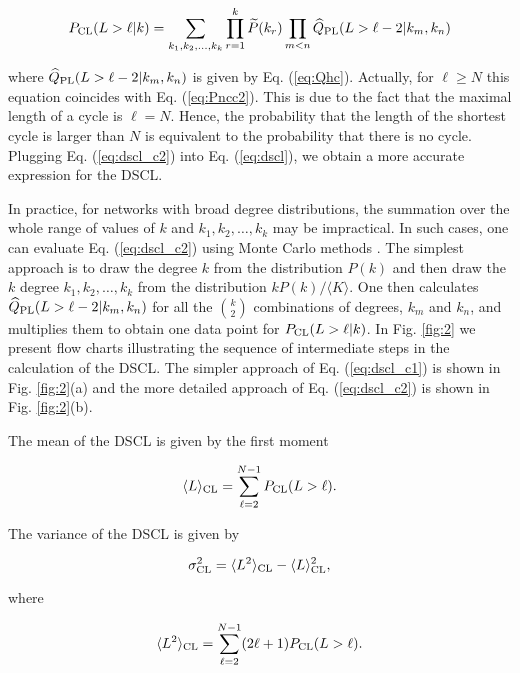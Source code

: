 \documentclass[preprint,pre,superscriptaddress,showpacs]{revtex4}
\begin{document}
\begin{equation}
P_{\rm CL}(L>\ell | k) = 
\sum_{k_1,k_2,\dots,k_k}
\prod_{r=1}^k
\widetilde P(k_r)
\prod_{m < n} 
\widehat Q_{\rm PL}(L>\ell-2 | k_m,k_n)
\label{eq:dscl_c2}
\end{equation}

\noindent
where 
$\widehat Q_{\rm PL}(L>\ell-2 | k_m,k_n)$
is given by Eq. (\ref{eq:Qhc}).
Actually, for $\ell \ge N$ this equation coincides with 
Eq. (\ref{eq:Pncc2}).
This is due to the fact that the maximal length of a cycle is $\ell=N$.
Hence, the probability that the length of the shortest cycle is larger than $N$ is equivalent to
the probability that there is no cycle.
Plugging Eq. (\ref{eq:dscl_c2}) into Eq. (\ref{eq:dscl}),
we obtain a more accurate expression for the DSCL.

In practice, for networks with broad degree distributions,
the summation over the whole range of values of $k$ and
$k_1,k_2,\dots,k_k$ may be impractical. In such cases,
one can evaluate Eq. (\ref{eq:dscl_c2}) using 
Monte Carlo methods
\cite{Newman1999}. 
The simplest approach is to draw the degree $k$ from the
distribution $P(k)$ and then draw the $k$ degree $k_1,k_2,\dots,k_k$
from the distribution $k P(k)/\langle K \rangle$.
One then calculates
$\widehat Q_{\rm PL}(L>\ell-2 | k_m,k_n)$
for all the $\binom{k}{2}$ combinations of degrees, $k_m$ and $k_n$,
and multiplies them to obtain one data point for
$P_{\rm CL}(L>\ell | k)$.
In Fig. \ref{fig:2} we present flow 
charts illustrating the sequence of intermediate steps in the
calculation of the DSCL.
The simpler approach of
Eq. (\ref{eq:dscl_c1}) is shown in Fig. \ref{fig:2}(a)
and the more detailed approach of
Eq. (\ref{eq:dscl_c2}) is shown in Fig. \ref{fig:2}(b).

The mean of the DSCL
is given by the first moment

\begin{equation}
\langle L \rangle_{\rm CL} = \sum_{\ell=2}^{N-1} P_{\rm CL}(L>\ell).
\label{eq:meanc_ell}
\end{equation}

\noindent
The variance of the DSCL is given by

\begin{equation}
\sigma_{\rm CL}^2 = \langle L^2 \rangle_{\rm CL} - \langle L \rangle_{\rm CL}^2,
\end{equation}

\noindent
where
 
\begin{equation}
\langle L^2 \rangle_{\rm CL} = \sum_{\ell=2}^{N-1} (2 \ell + 1) P_{\rm CL}(L>\ell).
\label{eq:secmomCL_ell}
\end{equation}
\end{document}
